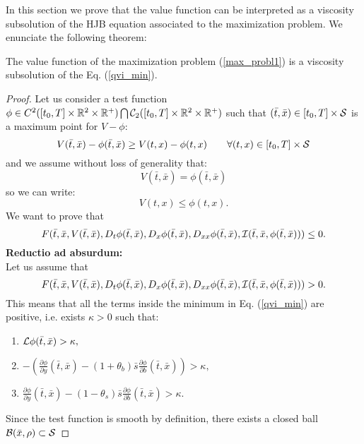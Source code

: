 In this section we prove that the value function can be interpreted as a viscosity subsolution of the HJB equation associated to the maximization problem. 
We enunciate the following theorem:
\begin{Theorem}\label{subsolution_th}
 The value function of the maximization problem (\ref{max_probl1}) is a viscosity subsolution of the Eq. (\ref{qvi_min}).
\end{Theorem}
\begin{proof}
Let us consider a test function $ \phi \in C^2([t_0,T] \times \mathbb{R}^2\times \mathbb{R}^+) \bigcap \mathcal{C}_2([t_0,T] \times \mathbb{R}^2\times \mathbb{R}^+)$ such that 
$(\bar t,\bar x) \in [t_0,T] \times \mathcal{S}$ is a maximum point for $V-\phi$:
\begin{equation}
 V(\bar t,\bar x) - \phi(\bar t,\bar x) \geq V(t,x) - \phi(t, x) \hspace{2em} \forall (t,x) \in [t_0,T] \times \mathcal{S}
\end{equation}
and we assume without loss of generality that:
\begin{equation}\label{max_point}
V(\bar t,\bar x) = \phi(\bar t,\bar x)  
\end{equation}
so we can write:
\begin{equation}\label{max_point2}
V(t,x) \leq \phi(t, x) .
\end{equation}
We want to prove that
$$ F(\bar t,\bar x,V(\bar t, \bar x),D_t \phi(\bar t, \bar x),D_x \phi(\bar t, \bar x),D_{xx}\phi(\bar t, \bar x),
\mathcal{I}(\bar t, \bar x,\phi(\bar t, \bar x))) \leq 0.  $$
\textbf{Reductio ad absurdum:}\\
Let us assume that 
$$F(\bar t,\bar x,V(\bar t, \bar x),D_t \phi(\bar t, \bar x),D_x \phi(\bar t, \bar x),D_{xx}\phi(\bar t, \bar x),
\mathcal{I}(\bar t,\bar x,\phi(\bar t, \bar x))) >0.$$ 
This means that all the terms inside the minimum in Eq. (\ref{qvi_min}) are positive, i.e. exists $\kappa >0$ such that:
\begin{enumerate}
 \item $ \mathcal{L} \phi(\bar t, \bar x) > \kappa ,$
 \item $-\left(\frac{\partial \phi}{\partial y}(\bar t, \bar x)
 -(1+\theta_b) \bar s \frac{\partial \phi}{\partial b}(\bar t, \bar x)\right) > \kappa,$
 \item $\frac{\partial \phi}{\partial y}(\bar t, \bar x)-(1-\theta_s) \bar s \frac{\partial \phi}{\partial b}(\bar t, \bar x) > \kappa.$
\end{enumerate}
Since the test function is smooth by definition, there exists a closed ball $\mathcal{B}(\bar x, \rho) \subset \mathcal{S}$

\end{proof}
